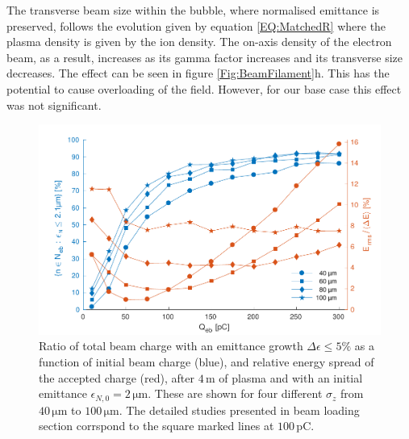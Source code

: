 \documentclass[aps,prstab,reprint,amsmath,amssymb,groupedaddress]{revtex4-1}
\newcommand{\unit}[1]{\,\mathrm{#1}}
\begin{document}
The transverse beam size within the bubble, where normalised emittance is preserved, follows the evolution given by
equation \ref{EQ:MatchedR} where the plasma density is given by the ion density. The on-axis density of the electron
beam, as a result, increases as its gamma factor increases and its transverse size decreases. The effect can be seen in
figure \ref{Fig:BeamFilament}h. This has the potential to cause overloading of the field. However, for our base case
this effect was not significant.

\begin{figure}[hbt]
    \includegraphics[width=\linewidth,trim={2mm 0mm 2mm 0mm},clip]{figures/beamQuality}
    \caption{\label{Fig:BeamQ} Ratio of total beam charge with an emittance growth $\Delta\epsilon \leq 5\%$ as a
        function of initial beam charge (blue), and relative energy spread of the accepted charge (red), after
        $4\unit{m}$ of plasma and with an initial emittance $\epsilon_{N,0}=2\unit{\mu m}$. These are shown for four
        different $\sigma_{z}$ from $40\unit{\mu m}$ to $100\unit{\mu m}$. The detailed studies presented in beam
        loading section corrspond to the square marked lines at $100\unit{pC}$.}
\end{figure}
\end{document}
